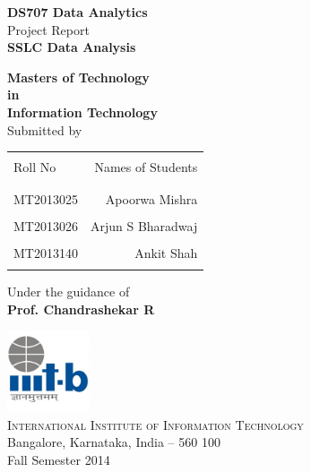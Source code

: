 \begin{titlepage}

\begin{center}

\textup{\small {\bf DS707 Data Analytics} \\ Project Report}\\[0.2in]

\Large \textbf {SSLC Data Analysis}\\[0.5in]       
        \vspace{.2in}

       {\bf Masters of Technology \\in\\ Information Technology}\\[0.5in]

\normalsize Submitted by \\
\begin{table}[h]
\centering
\begin{tabular}{lr}\hline \\
Roll No & Names of Students \\ \\ \hline
\\
MT2013025 & Apoorwa Mishra \\ \\
MT2013026 & Arjun S Bharadwaj \\ \\
MT2013140 & Ankit Shah \\ \\ \hline 
\end{tabular}
\end{table}

\vspace{.1in}
Under the guidance of\\
{\textbf{Prof. Chandrashekar R}}\\[0.2in]

\vfill

\includegraphics[width=0.18\textwidth]{./iiitb-logo}\\[0.1in]
\normalsize
\textsc{International Institute of Information Technology}\\
Bangalore, Karnataka, India -- 560 100 \\
\vspace{0.2cm}
Fall Semester 2014

\end{center}

\end{titlepage}
